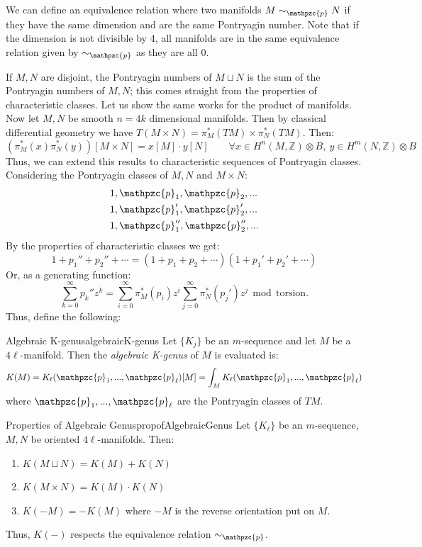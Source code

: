 \documentclass{book}
\newcommand{\Z}{{\mathbb{Z}}}
\newcommand{\cp}{{\mathpzc{p}}}
\renewcommand{\mod}{\,\operatorname{mod}\,}
\newcommand{\dcup}{\sqcup}
\begin{document}
We can define an equivalence relation where two manifolds $M\sim_\cp N$ if they have the same dimension and
are the same Pontryagin number. Note that if the dimension is not divisible by $4$, all manifolds are in the
same equivalence relation given by $\sim_\cp$ as they are all $0$.

If $M, N$ are disjoint, the Pontryagin numbers of $M\dcup N$ is the sum of the Pontryagin numbers of $M,N$;
this comes straight from the properties of characteristic classes. Let us show the same works for the product
of manifolds. Now let $M,N$ be smooth $n =4k$ dimensional manifolds. Then by classical differential geometry we have
$T(M\times N) = \pi_M^*(TM)\times \pi_N^*(TM)$. Then:
\[
  (\pi_M^*(x)\pi_N^*(y))[M\times N] = x[M]\cdot y[N] \qquad \forall x \in H^n(M,\Z)\otimes B,\ y \in H^m(N,\Z)\otimes B
\]
Thus, we can extend this results to characteristic sequences of Pontryagin classes.
Considering the Pontryagin classes of $M,N$ and $M\times N$:
\begin{align*}
  &1, \cp_1, \cp_2, ...\\
  &1, \cp_1', \cp_2', ...\\
  &1, \cp_1'', \cp_2'', ...\\
\end{align*}
By the properties of characteristic classes we get:
\[
  1 + p_1'' + p_2'' + \cdots = (1 + p_1 + p_2 + \cdots)(1 + p_1' + p_2' + \cdots)
\]
Or, as a generating function:
\[
  \sum_{k=0}^\infty p_k'' z^k = \sum_{i=0}^\infty \pi_M^*(p_i) z^i \sum_{j=0}^\infty \pi_N^*(p_j') z^j \mod \text{torsion}.
\]
Thus, define the following:
\begin{defn}{Algebraic K-genus}{algebraicK-genus}
  Let $\{K_j\}$ be an $m$-sequence and let $M$ be a $4\ell$-manifold. Then the \emph{algebraic K-genus} of
  $M$ is evaluated is:
  \[
    K(M) = K_\ell(\cp_1, ..., \cp_\ell)[M] = \int_M K_\ell(\cp_1, ..., \cp_\ell)
  \]
  where $\cp_1, ..., \cp_\ell$ are the Pontryagin classes of $TM$.
\end{defn}

\begin{prop}{Properties of Algebraic Genus}{propofAlgebraicGenus}
  Let $\{K_\ell\}$ be an $m$-sequence, $M,N$ be oriented $4\ell$-manifolds. Then:
  \begin{enumerate}
    \item $K(M\dcup N) = K(M)+K(N)$
    \item $K(M\times N) = K(M)\cdot K(N)$
    \item $K(-M) = -K(M)$ where $-M$ is the reverse orientation put on $M$.
  \end{enumerate}
  Thus, $K(-)$ respects the equivalence relation $\sim_\cp$.
\end{prop}
\end{document}
